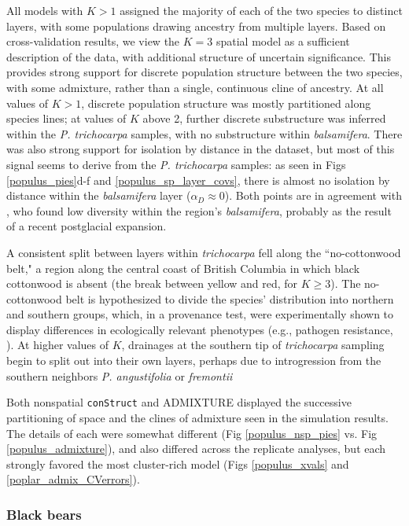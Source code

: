 \documentclass[10pt,letterpaper]{article}
\newcommand{\tri}{\textit{trichocarpa}}
\newcommand{\bals}{\textit{balsamifera}}
\begin{document}
All models with $K>1$ assigned the majority of each of the two species
to distinct layers, with some populations drawing ancestry from multiple layers.
Based on cross-validation results, we view the $K=3$ spatial model 
as a sufficient description of the data,
with additional structure of uncertain significance.
This provides strong support for discrete population structure between the two species,
with some admixture,
rather than a single, continuous cline of ancestry.
At all values of $K>1$, discrete population structure was mostly partitioned along species lines; 
at values of $K$ above 2, further discrete substructure was inferred within the \textit{P. trichocarpa} samples,
with no substructure within \bals{}.
There was also strong support for isolation by distance in the dataset, 
but most of this signal seems to derive from the \textit{P. trichocarpa} samples:
as seen in Figs \ref{populus_pies}d-f and \ref{populus_sp_layer_covs},
there is almost no isolation by distance within the \bals{} layer ($\alpha_D \approx 0$).
Both points are
in agreement with \cite{keller_etal_2010}, 
who found low diversity within the region's \bals{},
probably as the result of a recent postglacial expansion.

A consistent split between layers within \tri{} fell along the ``no-cottonwood belt," 
a region along the central coast of British Columbia in which black
cottonwood is absent (the break between yellow and red, for $K \geq 3$). 
The no-cottonwood belt is hypothesized to divide the species' distribution
into northern and southern groups, which, in a provenance test, 
were experimentally shown to display differences in ecologically relevant phenotypes 
(e.g., pathogen resistance, \cite{xie2009,xie2012}).  
At higher values of $K$, drainages at the southern tip of \tri{} sampling 
begin to split out into their own layers,
perhaps due to introgression from the southern neighbors
\textit{P. angustifolia} or \textit{fremontii} \cite{Zhou2012,geraldes_etal_2014}


Both nonspatial \texttt{conStruct} and ADMIXTURE displayed 
the successive partitioning of space and the clines of admixture seen in the simulation results.
The details of each were somewhat different 
(Fig \ref{populus_nsp_pies} vs. Fig \ref{populus_admixture}), 
and also differed across the replicate analyses, 
but each strongly favored the most cluster-rich model
(Figs \ref{populus_xvals} and \ref{poplar_admix_CVerrors}).

\subsubsection*{Black bears}
\end{document}
